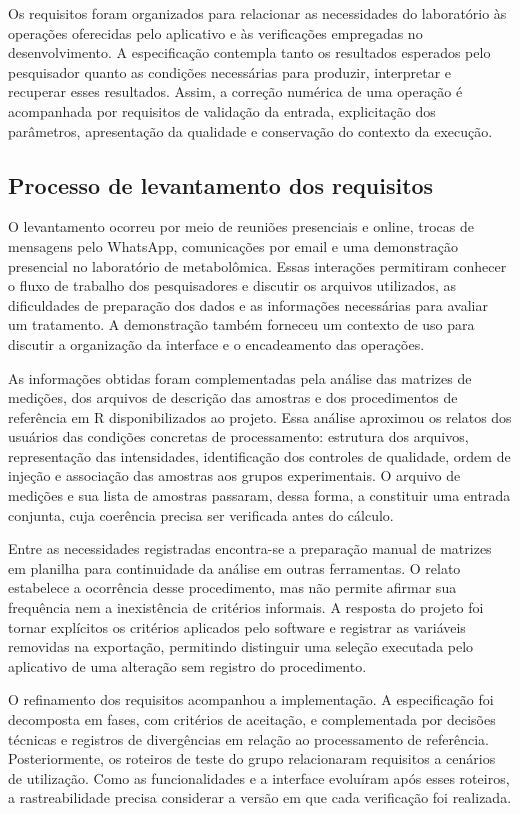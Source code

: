 Os requisitos foram organizados para relacionar as necessidades do laboratório às operações oferecidas pelo aplicativo e às verificações empregadas no desenvolvimento. A especificação contempla tanto os resultados esperados pelo pesquisador quanto as condições necessárias para produzir, interpretar e recuperar esses resultados. Assim, a correção numérica de uma operação é acompanhada por requisitos de validação da entrada, explicitação dos parâmetros, apresentação da qualidade e conservação do contexto da execução.

\subsection{Processo de levantamento dos requisitos}

O levantamento ocorreu por meio de reuniões presenciais e online, trocas de mensagens pelo WhatsApp, comunicações por email e uma demonstração presencial no laboratório de metabolômica. Essas interações permitiram conhecer o fluxo de trabalho dos pesquisadores e discutir os arquivos utilizados, as dificuldades de preparação dos dados e as informações necessárias para avaliar um tratamento. A demonstração também forneceu um contexto de uso para discutir a organização da interface e o encadeamento das operações.

As informações obtidas foram complementadas pela análise das matrizes de medições, dos arquivos de descrição das amostras e dos procedimentos de referência em R disponibilizados ao projeto. Essa análise aproximou os relatos dos usuários das condições concretas de processamento: estrutura dos arquivos, representação das intensidades, identificação dos controles de qualidade, ordem de injeção e associação das amostras aos grupos experimentais. O arquivo de medições e sua lista de amostras passaram, dessa forma, a constituir uma entrada conjunta, cuja coerência precisa ser verificada antes do cálculo.

Entre as necessidades registradas encontra-se a preparação manual de matrizes em planilha para continuidade da análise em outras ferramentas. O relato estabelece a ocorrência desse procedimento, mas não permite afirmar sua frequência nem a inexistência de critérios informais. A resposta do projeto foi tornar explícitos os critérios aplicados pelo software e registrar as variáveis removidas na exportação, permitindo distinguir uma seleção executada pelo aplicativo de uma alteração sem registro do procedimento.

O refinamento dos requisitos acompanhou a implementação. A especificação foi decomposta em fases, com critérios de aceitação, e complementada por decisões técnicas e registros de divergências em relação ao processamento de referência. Posteriormente, os roteiros de teste do grupo relacionaram requisitos a cenários de utilização. Como as funcionalidades e a interface evoluíram após esses roteiros, a rastreabilidade precisa considerar a versão em que cada verificação foi realizada.

